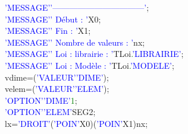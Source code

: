 \textcolor{blue}{'MESSAGE'}\hspace*{1em}\textcolor{blue}{'---------------------------------'}\hspace*{1em};\\
\textcolor{blue}{'MESSAGE'}\hspace*{1em}\textcolor{blue}{' Début              : '}\hspace*{1em}X0;\\
\textcolor{blue}{'MESSAGE'}\hspace*{1em}\textcolor{blue}{' Fin                : '}\hspace*{1em}X1;\\
\textcolor{blue}{'MESSAGE'}\hspace*{1em}\textcolor{blue}{' Nombre de valeurs  : '}\hspace*{1em}nx;\\
\textcolor{blue}{'MESSAGE'}\hspace*{1em}\textcolor{blue}{' Loi : librairie    : '}\hspace*{1em}TLoi\textcolor{green}{.}\textcolor{blue}{'LIBRAIRIE'};\\
\textcolor{blue}{'MESSAGE'}\hspace*{1em}\textcolor{blue}{' Loi : Modèle       : '}\hspace*{1em}TLoi\textcolor{green}{.}\textcolor{blue}{'MODELE'};\\
vdime=(\textcolor{blue}{'VALEUR'}\hspace*{1em}\textcolor{blue}{'DIME'});\\
velem=(\textcolor{blue}{'VALEUR'}\hspace*{1em}\textcolor{blue}{'ELEM'});\\
\textcolor{blue}{'OPTION'}\hspace*{1em}\textcolor{blue}{'DIME'}\hspace*{1em}\textcolor{green}{1};\\
\textcolor{blue}{'OPTION'}\hspace*{1em}\textcolor{blue}{'ELEM'}\hspace*{1em}SEG2;\\
lx\hspace*{1em}=\hspace*{1em}\textcolor{blue}{'DROIT'}\hspace*{1em}(\textcolor{blue}{'POIN'}\hspace*{1em}X0)\hspace*{1em}(\textcolor{blue}{'POIN'}\hspace*{1em}X1)\hspace*{1em}nx;\\
